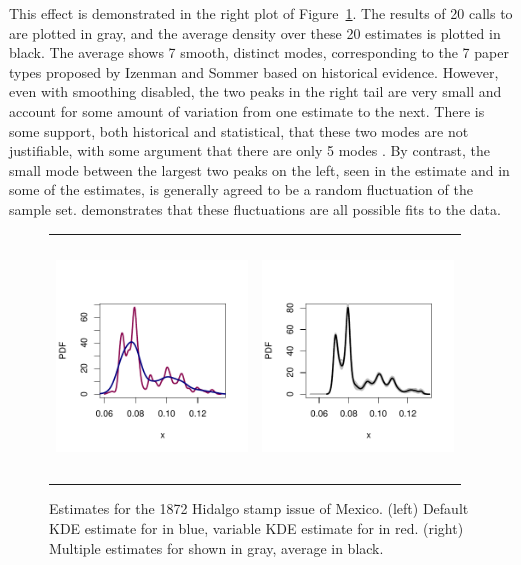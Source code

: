 This effect is demonstrated in the right plot of Figure~\ref{fig:stamp}. The results of 20 calls to  are plotted in gray, and the average density over these 20 estimates is plotted in black. The average shows 7 smooth, distinct modes, corresponding to the 7 paper types proposed by Izenman and Sommer based on historical evidence. However, even with smoothing disabled, the two peaks in the right tail are very small and account for some amount of variation from one estimate to the next. There is some support, both historical and statistical, that these two modes are not justifiable, with some argument that there are only 5 modes \citep{stamp2, stamp4}. By contrast, the small mode between the largest two peaks on the left, seen in the  estimate and in some of the  estimates, is generally agreed to be a random fluctuation of the sample set.  demonstrates that these fluctuations are all possible fits to the data.


\begin{figure}[tbp]
\centering
\begin{tabular}{p{} p{}}
  \vspace{0pt} \includegraphics[width=2.0in, height=2.5in]{Figure10a.pdf} &
  \vspace{0pt} \includegraphics[width=2.0in, height=2.5in]{Figure10b.pdf} 
\end{tabular}
\caption{\label{fig:stamp} Estimates for the 1872 Hidalgo stamp issue of Mexico. (left) Default KDE estimate for  in blue, variable KDE estimate for  in red. (right) Multiple estimates for  shown in gray, average in black.}
\end{figure}


